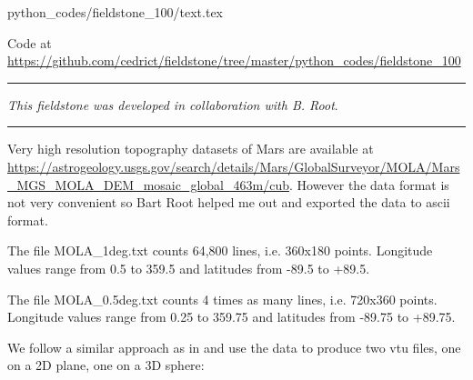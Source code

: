 \begin{flushright} {\tiny {\color{gray} python\_codes/fieldstone\_100/text.tex}} \end{flushright}



\begin{center}
Code at \url{https://github.com/cedrict/fieldstone/tree/master/python_codes/fieldstone_100}
\end{center}

\par\noindent\rule{\textwidth}{0.4pt}

{\sl This fieldstone was developed in collaboration with B. Root}. 

\par\noindent\rule{\textwidth}{0.4pt}

Very high resolution topography datasets of Mars are available at 
\url{https://astrogeology.usgs.gov/search/details/Mars/GlobalSurveyor/MOLA/Mars_MGS_MOLA_DEM_mosaic_global_463m/cub}.
However the data format is not very convenient so Bart Root 
helped me out and exported the data to ascii format.

The file {\filenamefont MOLA\_1deg.txt} counts 64,800 lines, 
i.e. 360x180 points. Longitude values range from  
0.5 to 359.5 and latitudes from -89.5 to +89.5. 

The file {\filenamefont MOLA\_0.5deg.txt} counts 4 times as many lines, 
i.e. 720x360 points. Longitude values range from  
0.25 to 359.75 and latitudes from -89.75 to +89.75. 




We follow a similar approach as in  and use the data to produce 
two vtu files, one on a 2D plane, one on a 3D sphere:

